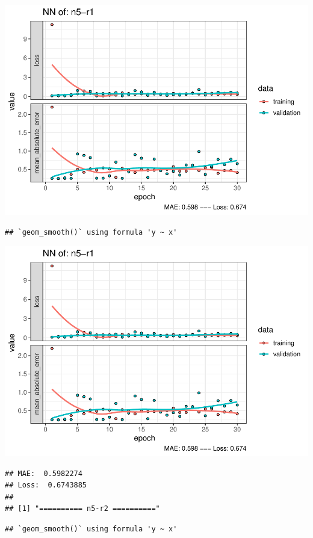 \documentclass[
]{article}
\begin{document}
\includegraphics{project-code_files/figure-latex/unnamed-chunk-18-35.pdf}

\begin{verbatim}
## `geom_smooth()` using formula 'y ~ x'
\end{verbatim}

\includegraphics{project-code_files/figure-latex/unnamed-chunk-18-36.pdf}

\begin{verbatim}
## MAE:  0.5982274
## Loss:  0.6743885 
## 
## [1] "========== n5-r2 =========="
\end{verbatim}

\begin{verbatim}
## `geom_smooth()` using formula 'y ~ x'
\end{verbatim}
\end{document}
